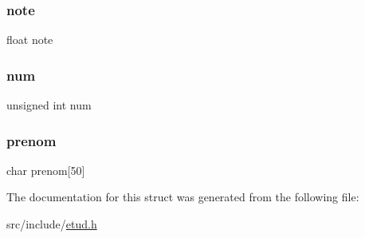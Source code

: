 \mbox{\label{structetud_a6237b049d81028868055c48398511caf}} 
\subsubsection{\texorpdfstring{note}{note}}
{\footnotesize\ttfamily float note}

\mbox{\label{structetud_a41ddefd3473727cad32a9767c10faed8}} 
\subsubsection{\texorpdfstring{num}{num}}
{\footnotesize\ttfamily unsigned int num}

\mbox{\label{structetud_acf879196fb0116270795a768b12baccf}} 
\subsubsection{\texorpdfstring{prenom}{prenom}}
{\footnotesize\ttfamily char prenom\mbox{[}50\mbox{]}}



The documentation for this struct was generated from the following file\+:\begin{DoxyCompactItemize}
\item 
src/include/\hyperlink{etud_8h}{etud.\+h}\end{DoxyCompactItemize}

